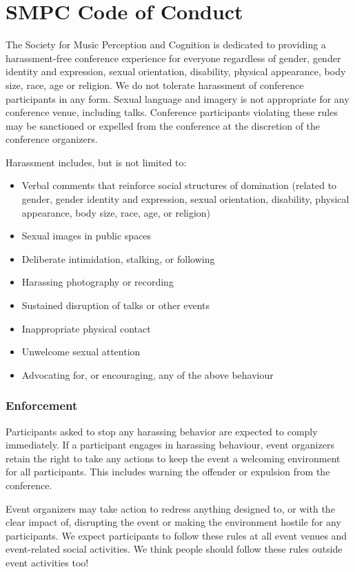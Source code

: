 \newpage
\section*{SMPC Code of Conduct}


The Society for Music Perception and Cognition is dedicated to providing a harassment-free conference experience for everyone regardless of gender, gender identity and expression, sexual orientation, disability, physical appearance, body size, race, age or religion. We do not tolerate harassment of conference participants in any form. Sexual language and imagery is not appropriate for any conference venue, including talks. Conference participants violating these rules may be sanctioned or expelled from the conference at the discretion of the conference organizers. 

Harassment includes, but is not limited to:
\begin{itemize}
\item Verbal comments that reinforce social structures of domination (related to gender, gender identity and expression, sexual orientation, disability, physical appearance, body size, race, age, or religion)
\item Sexual images in public spaces
\item Deliberate intimidation, stalking, or following 
\item Harassing photography or recording
\item Sustained disruption of talks or other events
\item Inappropriate physical contact
\item Unwelcome sexual attention
\item Advocating for, or encouraging, any of the above behaviour
\end{itemize}

\subsubsection*{Enforcement}

Participants asked to stop any harassing behavior are expected to comply immediately. If a participant engages in harassing behaviour, event organizers retain the right to take any actions to keep the event a welcoming environment for all participants. This includes warning the offender or expulsion from the conference.

Event organizers may take action to redress anything designed to, or with the clear impact of, disrupting the event or making the environment hostile for any participants. We expect participants to follow these rules at all event venues and event-related social activities. We think people should follow these rules outside event activities too!

